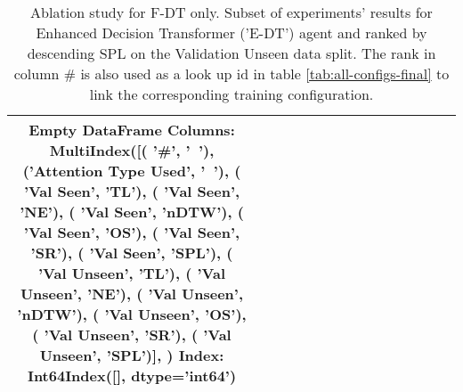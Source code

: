 \begin{table}
\centering
\caption{\label{tab:e_dt_full_dt_ablation}Ablation study for F-DT only. Subset of experiments' results for Enhanced Decision Transformer ('E-DT') agent and ranked by descending SPL on the Validation Unseen data split. The rank in column \# is also used as a look up id in table \ref{tab:all-configs-final} to link the corresponding training configuration.}
\begin{tabular}{@{\hskip3pt}c@{\hskip3pt}c@{\hskip3pt}c@{\hskip3pt}c@{\hskip3pt}c@{\hskip3pt}c@{\hskip3pt}c@{\hskip3pt}c@{\hskip3pt}c@{\hskip3pt}c@{\hskip3pt}c@{\hskip3pt}c@{\hskip3pt}c@{\hskip3pt}c@{\hskip3pt}c}
\toprule
Empty DataFrame
Columns: MultiIndex([(                 '\textbf{\#}',    '\textbf{~}'),
            ('\textbf{Attention Type Used}',    '\textbf{~}'),
            (           '\textbf{Val Seen}',   '\textbf{TL}'),
            (           '\textbf{Val Seen}',   '\textbf{NE}'),
            (           '\textbf{Val Seen}', '\textbf{nDTW}'),
            (           '\textbf{Val Seen}',   '\textbf{OS}'),
            (           '\textbf{Val Seen}',   '\textbf{SR}'),
            (           '\textbf{Val Seen}',  '\textbf{SPL}'),
            (         '\textbf{Val Unseen}',   '\textbf{TL}'),
            (         '\textbf{Val Unseen}',   '\textbf{NE}'),
            (         '\textbf{Val Unseen}', '\textbf{nDTW}'),
            (         '\textbf{Val Unseen}',   '\textbf{OS}'),
            (         '\textbf{Val Unseen}',   '\textbf{SR}'),
            (         '\textbf{Val Unseen}',  '\textbf{SPL}')],
           )
Index: Int64Index([], dtype='int64') \\
\bottomrule
\end{tabular}
\end{table}
